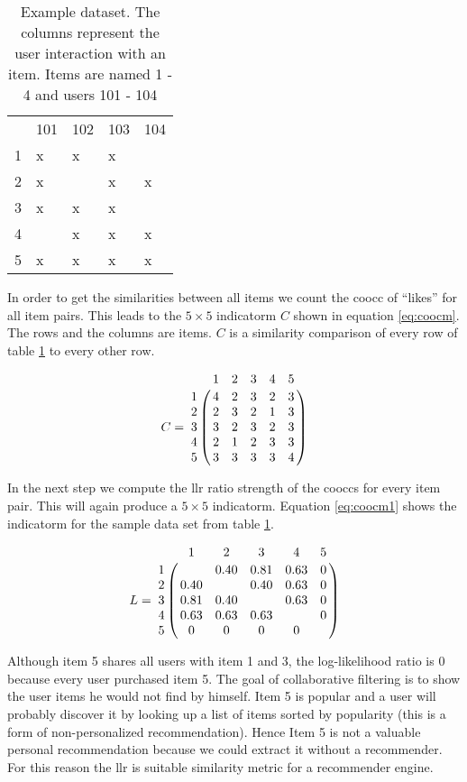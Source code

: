 \begin{table}
\begin{center}
\begin{tabular}{rllll}
 & 101 & 102 & 103 & 104\\
1 & x & x & x &  \\
2 & x &   & x & x\\
3 & x & x & x &  \\
4 &   & x & x & x\\
5 & x & x & x & x\\
\end{tabular}
\end{center}
\caption{Example dataset. The columns represent the user interaction with an item. Items are named 1 - 4 and users 101 - 104}
\label{tbl:llr1}
\end{table}

In order to get the similarities between all items we count the \gls{coocc} of ``\glspl{like}'' for all item pairs. This leads to the $5 \times 5$ \gls{indicatorm} $C$ shown in equation \ref{eq:coocm}. The rows and the columns are items. $C$ is a similarity comparison of every row of table \ref{tbl:llr1} to every other row.

\begin{equation}
  \label{eq:coocm}
C =\bordermatrix{~ & 1 & 2 & 3 & 4 & 5 \cr
1 & 4 & 2 & 3 & 2 & 3 \cr
2 & 2 & 3 & 2 & 1 & 3 \cr
3 & 3 & 2 & 3 & 2 & 3 \cr
4 & 2 & 1 & 2 & 3 & 3 \cr
5 & 3 & 3 & 3 & 3 & 4 \cr}
\end{equation}

In the next step we compute the \gls{llr} ratio strength of the \glspl{coocc} for every item pair. This will again produce a $5 \times 5$ \gls{indicatorm}. Equation \ref{eq:coocm1} shows the \gls{indicatorm} for the sample data set from table \ref{tbl:llr1}.

\begin{equation}
  \label{eq:coocm1}
L =\bordermatrix{~ & 1 & 2 & 3 & 4 & 5 \cr
1 &   & 0.40 & 0.81 & 0.63 & 0 \cr
2 & 0.40 &  & 0.40 & 0.63 & 0 \cr
3 & 0.81 & 0.40 &  & 0.63 & 0 \cr
4 & 0.63 & 0.63 & 0.63 &  & 0 \cr
5 & 0 & 0 & 0 & 0 & \cr
}
\end{equation}

Although item 5 shares all users with item 1 and 3, the log-likelihood ratio is 0 because every user purchased item 5. The goal of collaborative filtering is to show the user items he would not find by himself. Item 5 is popular and a user will probably discover it by looking up a list of items sorted by popularity (this is a form of non-personalized recommendation). Hence Item 5 is not a valuable personal recommendation because we could extract it without a recommender. For this reason the \gls{llr} is suitable similarity metric for a recommender engine.

